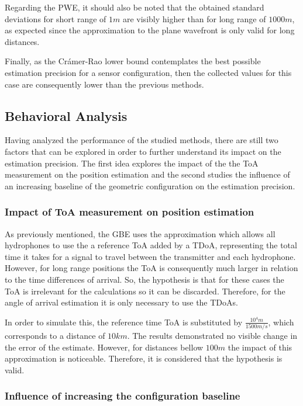 Regarding the PWE, it should also be noted that the obtained standard deviations for short range of $1m$ are visibly higher than for long range of $1000m$, as expected since the approximation to the plane wavefront is only valid for long distances.

Finally, as the Crámer-Rao lower bound contemplates the best possible estimation precision for a sensor configuration, then the collected values for this case are consequently lower than the previous methods. 

\subsection{Behavioral Analysis}

Having analyzed the performance of the studied methods, there are still two factors that can be explored in order to further understand its impact on the estimation precision.  The first idea explores the impact of the the ToA measurement on the position estimation and the second studies the influence of an increasing baseline of the geometric configuration on the estimation precision.

\subsubsection{Impact of ToA measurement on position estimation}

As previously mentioned, the GBE uses the approximation which allows all hydrophones to use the a reference ToA added by a TDoA, representing the total time it takes for a signal to travel between the transmitter and each hydrophone. However, for long range positions the ToA is consequently much larger in relation to the time differences of arrival. So, the hypothesis is that for these cases the ToA is irrelevant for the calculations so it can be discarded. Therefore, for the angle of arrival estimation it is only necessary to use the TDoAs.

In order to simulate this, the reference time ToA is substituted by $\frac{10^4 m}{1500 m/s}$, which corresponds to a distance of $10 km$. The results demonstrated no visible change in the error of the estimate. However, for distances bellow $100m$ the impact of this approximation is noticeable. Therefore, it is considered that the hypothesis is valid. 

\subsubsection{Influence of increasing the configuration baseline}

